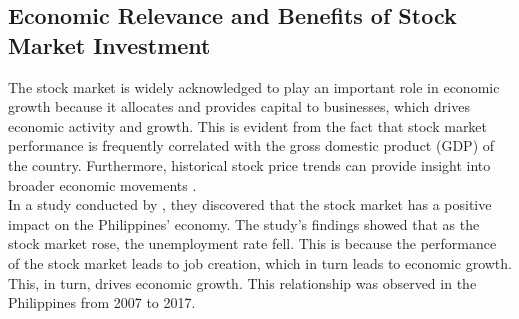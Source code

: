 \subsection{Economic Relevance and Benefits of Stock Market Investment}
The stock market is widely acknowledged to play an important role in economic 
growth because it allocates and provides capital to businesses, which drives economic 
activity and growth. This is evident from the fact that stock market performance 
is frequently correlated with the gross domestic product (GDP) of the country.
\cite{TradeBrains, Hall2022, Bae2017}
Furthermore, historical stock price trends can provide insight 
into broader economic movements
\cite{Campbell2021}.
\hfill \\

In a study conducted by , they discovered that the stock market
has a positive impact on the Philippines' economy. The study's findings showed that
as the stock market rose, the unemployment rate fell. This is because the performance 
of the stock market leads to job creation, which in turn leads to economic growth.
This, in turn, drives economic growth. This relationship was observed
in the Philippines from 2007 to 2017.